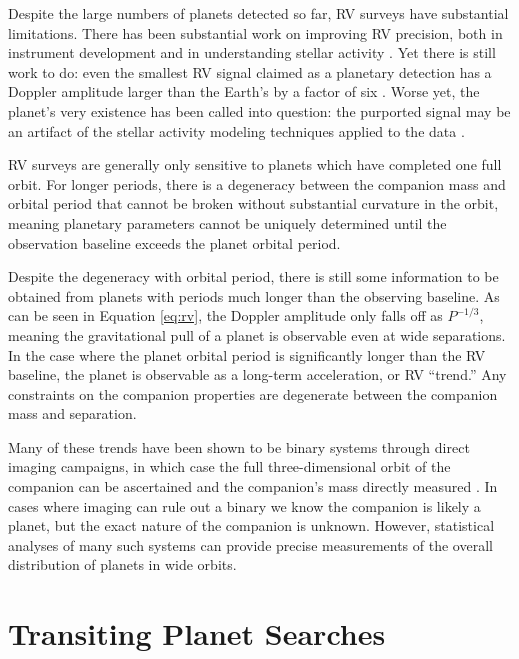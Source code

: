 Despite the large numbers of planets detected so far, RV surveys have substantial
limitations.
There has been substantial work on improving RV precision, both
in instrument development and in understanding stellar activity \citep{Fischer16}.
Yet there is still work to do: even the smallest RV signal claimed as a planetary
detection has a Doppler amplitude larger than the Earth's by a factor of six
\citep{Dumusque12}. 
Worse yet, the planet's very existence has been called into question:
the purported signal may be
an artifact of the stellar activity modeling techniques applied to the data
\citep{Rajpaul16}.

RV surveys are generally only sensitive to planets which have completed
one full orbit.
For longer periods, there is a degeneracy between the companion mass and orbital period
that cannot be broken without substantial curvature in the orbit, meaning planetary
parameters cannot be uniquely determined until the observation baseline exceeds the
planet orbital period.

Despite the degeneracy with orbital period, there is still some information to be
obtained from planets with periods much longer than the observing baseline.
As can be seen in Equation \ref{eq:rv}, the Doppler amplitude only falls off as $P^{-1/3}$,
meaning the gravitational pull of a planet is observable even at wide separations.
In the case where the planet orbital period is significantly longer than the RV baseline,
the planet is observable as a long-term acceleration, or RV ``trend.''
Any constraints on the companion properties are degenerate between the companion mass
and separation.

Many of these trends have been shown to be binary systems through direct imaging campaigns, in which case the full three-dimensional orbit of the companion can be 
ascertained and the companion's mass directly measured \citep{Crepp12b, Crepp13a, Crepp13b}.
In cases where imaging can rule out a binary we know the companion is likely a planet,
but the exact nature of the companion is unknown. 
However, statistical analyses of many such systems can provide precise measurements of
the overall distribution of planets in wide orbits.


\section{Transiting Planet Searches}
